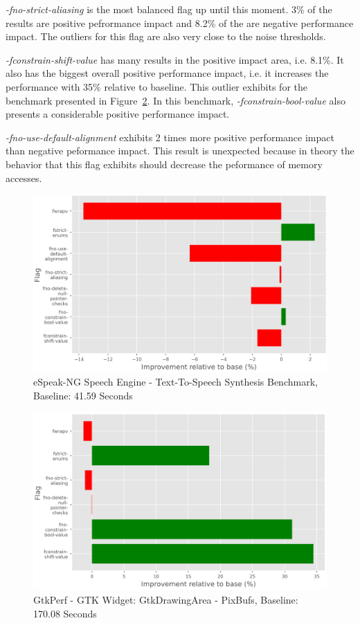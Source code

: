 \textit{-fno-strict-aliasing} is the most balanced flag up until this moment.
3\% of the results are positive pefrormance impact and 8.2\% of the are negative
performance impact. The outliers for this flag are also very close to the noise
thresholds.

\textit{-fconstrain-shift-value} has many results in the positive impact area,
i.e. 8.1\%. It also has the biggest overall positive performance impact, i.e.
it increases the performance with 35\% relative to baseline. This outlier
exhibits for the benchmark presented in Figure~\ref{fig:gtkperf}. In this
benchmark, \textit{-fconstrain-bool-value} also presents a considerable positive
performance impact.

\textit{-fno-use-default-alignment} exhibits 2 times more positive performance
impact than negative peformance impact. This result is unexpected because in
theory the behavior that this flag exhibits should decrease the peformance of
memory accesses.

\begin{figure}[H]
\includegraphics[scale=0.8]{espeak}
\caption{eSpeak-NG Speech Engine - Text-To-Speech Synthesis Benchmark, Baseline:
41.59 Seconds}
\label{fig:espeak}
\end{figure}

\begin{figure}[H]
\includegraphics[scale=0.8]{gtkperf}
\caption{GtkPerf - GTK Widget: GtkDrawingArea - PixBufs, Baseline: 170.08
Seconds}
\label{fig:gtkperf}
\end{figure}
